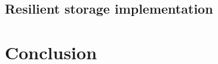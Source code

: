 \documentclass{llncs}
\begin{document}

\subsection{Resilient storage implementation}

\section{Conclusion}
\end{document}
